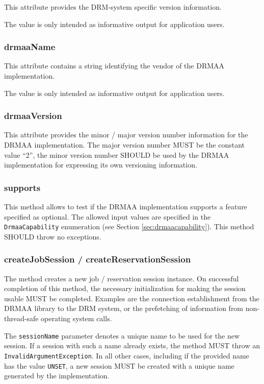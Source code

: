 \documentclass{article}
\newcommand{\h}[1]{\lstinline|#1|}
\begin{document}
This attribute provides the DRM-system specific version information. 

The value is only intended as informative output for application users.

\subsubsection{drmaaName}

This attribute contains a string identifying the vendor of the DRMAA implementation.  

The value is only intended as informative output for application users.

\subsubsection{drmaaVersion}

This attribute provides the minor / major version number information for the DRMAA implementation. The major version number MUST be the constant value \enquote{2}, the minor version number SHOULD be used by the DRMAA implementation for expressing its own versioning information.

\subsubsection{supports}
\label{sec:supports}

This method allows to test if the DRMAA implementation supports a feature specified as optional. The allowed input values are specified in the \h{DrmaaCapability} enumeration (see Section \ref{sec:drmaacapability}). This method SHOULD throw no exceptions.

\subsubsection{createJobSession / createReservationSession}

The method creates a new job / reservation session instance. On successful completion of this method, the necessary initialization for making the session usable MUST be completed. Examples are the connection establishment from the DRMAA library to the DRM system, or the prefetching of information from non-thread-safe operating system calls.

The \h{sessionName} parameter denotes a unique name to be used for the new session. If a session with such a name already exists, the method MUST throw an \h{InvalidArgumentException}. In all other cases, including if the provided name has the value \h{UNSET}, a new session MUST be created with a unique name generated by the implementation. 
\end{document}
